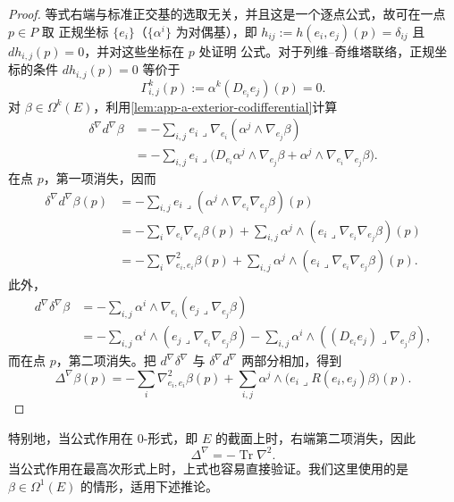 \begin{proof}
等式右端与标准正交基的选取无关，并且这是一个逐点公式，故可在一点 $p\in P$ 取
正规坐标 $\{e_i\}$（$\{\alpha^i\}$ 为对偶基），即
$h_{ij}:=h(e_i,e_j)(p)=\delta_{ij}$ 且 $dh_{i,j}(p)=0$，并对这些坐标在 $p$ 处证明
公式。对于列维--奇维塔联络，正规坐标的条件 $dh_{i,j}(p)=0$ 等价于
\[
 \Gamma^k_{i,j}(p):=\alpha^k(D_{e_i}e_j)(p)=0.
\]
对 $\beta\in\Omega^k(E)$，利用\cref{lem:app-a-exterior-codifferential}计算
\begin{align*}
 \delta^\nabla d^\nabla\beta
 &=-\sum_{i,j}e_i\mathbin{\lrcorner}\nabla_{e_i}
       (\alpha^j\wedge\nabla_{e_j}\beta)\\
 &=-\sum_{i,j}e_i\mathbin{\lrcorner}
   \bigl(D_{e_i}\alpha^j\wedge\nabla_{e_j}\beta
   +\alpha^j\wedge\nabla_{e_i}\nabla_{e_j}\beta\bigr).
\end{align*}
在点 $p$，第一项消失，因而
\begin{align*}
 \delta^\nabla d^\nabla\beta(p)
 &=-\sum_{i,j}e_i\mathbin{\lrcorner}
       (\alpha^j\wedge\nabla_{e_i}\nabla_{e_j}\beta)(p)\\
 &=-\sum_i\nabla_{e_i}\nabla_{e_i}\beta(p)
   +\sum_{i,j}\alpha^j\wedge
      (e_i\mathbin{\lrcorner}\nabla_{e_i}\nabla_{e_j}\beta)(p)\\
 &=-\sum_i\nabla^2_{e_i,e_i}\beta(p)
   +\sum_{i,j}\alpha^j\wedge
      (e_i\mathbin{\lrcorner}\nabla_{e_i}\nabla_{e_j}\beta)(p).
\end{align*}
此外，
\begin{align*}
 d^\nabla\delta^\nabla\beta
 &=-\sum_{i,j}\alpha^i\wedge\nabla_{e_i}
      (e_j\mathbin{\lrcorner}\nabla_{e_j}\beta)\\
 &=-\sum_{i,j}\alpha^i\wedge
      (e_j\mathbin{\lrcorner}\nabla_{e_i}\nabla_{e_j}\beta)
   -\sum_{i,j}\alpha^i\wedge
      ((D_{e_i}e_j)\mathbin{\lrcorner}\nabla_{e_j}\beta),
\end{align*}
而在点 $p$，第二项消失。把 $d^\nabla\delta^\nabla$ 与
$\delta^\nabla d^\nabla$ 两部分相加，得到
\[
 \Delta^\nabla\beta(p)
 =-\sum_i\nabla^2_{e_i,e_i}\beta(p)
 +\sum_{i,j}\alpha^j\wedge
  \bigl(e_i\mathbin{\lrcorner}R(e_i,e_j)\beta\bigr)(p).
\]
\end{proof}

特别地，当公式作用在 $0$-形式，即 $E$ 的截面上时，右端第二项消失，因此
\[
 \Delta^\nabla=-\operatorname{Tr}\nabla^2.
\]
当公式作用在最高次形式上时，上式也容易直接验证。我们这里使用的是
$\beta\in\Omega^1(E)$ 的情形，适用下述推论。

